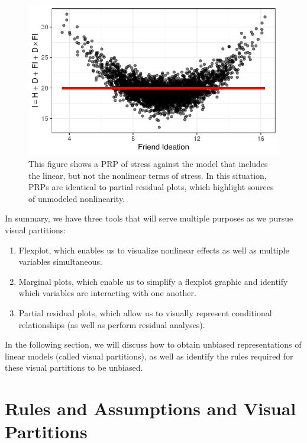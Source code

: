 \documentclass[
  man,floatsintext]{apa6}
\providecommand{\tightlist}{%
  \setlength{\itemsep}{0pt}\setlength{\parskip}{0pt}}
\begin{document}
\begin{figure}

{\centering \includegraphics[width=0.75\linewidth]{visual_partitions_files/figure-latex/missingnonlin-1} 

}

\caption{This figure shows a PRP of stress against the model that includes the linear, but not the nonlinear terms of stress. In this situation, PRPs are identical to partial residual plots, which highlight sources of unmodeled nonlinearity.}\label{fig:missingnonlin}
\end{figure}

In summary, we have three tools that will serve multiple purposes as we pursue visual partitions:

\begin{enumerate}
\def\labelenumi{\arabic{enumi}.}
\tightlist
\item
  Flexplot, which enables us to visualize nonlinear effects as well as multiple variables simultaneous.
\item
  Marginal plots, which enable us to simplify a flexplot graphic and identify which variables are interacting with one another.
\item
  Partial residual plots, which allow us to visually represent conditional relationships (as well as perform residual analyses).
\end{enumerate}

In the following section, we will discuss how to obtain unbiased representations of linear models (called visual partitions), as well as identify the rules required for these visual partitions to be unbiased.

\section{Rules and Assumptions and Visual Partitions}\label{rules-and-assumptions-and-visual-partitions}
\end{document}
